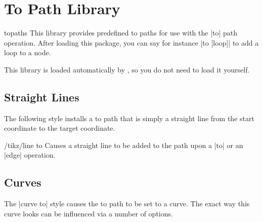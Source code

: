 %
%
%

\section{To Path Library}

\label{library-to-paths}

\begin{tikzlibrary}{topaths}
  This library provides predefined to paths for use with the |to|
  path operation. After loading this package, you can say for instance
  |to [loop]| to add a loop to a node.

  This library is loaded automatically by \tikzname, so you do not
  need to load it yourself.
\end{tikzlibrary}


\subsection{Straight Lines}

The following style installs a to path that is simply a straight line
from the start coordinate to the target coordinate.

\begin{key}{/tikz/line to}
  Causes a straight line to be added to the path upon a |to| or an
  |edge| operation.
\begin{codeexample}[]
\end{codeexample}
\end{key}


\subsection{Curves}

The |curve to| style causes the to path to be set to a curve. The
exact way this curve looks can be influenced via a number of options.

